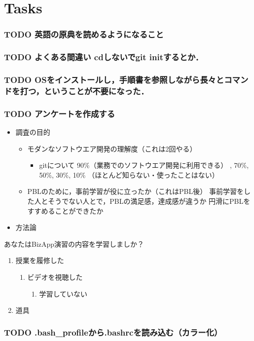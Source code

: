 \documentclass[t, aspectratio=169]{beamer}
\begin{document}
\part{Tasks}
\label{sec-11}
\section{{\bfseries\sffamily TODO} 英語の原典を読めるようになること}
\label{sec-11-1}
\section{{\bfseries\sffamily TODO} よくある間違い cdしないでgit initするとか．}
\label{sec-11-2}
\section{{\bfseries\sffamily TODO} OSをインストールし，手順書を参照しながら長々とコマンドを打つ，ということが不要になった．}
\label{sec-11-3}
\section{{\bfseries\sffamily TODO} アンケートを作成する}
\label{sec-11-4}
\begin{itemize}
\item 調査の目的
\begin{itemize}
\item モダンなソフトウエア開発の理解度（これは2回やる）
\begin{itemize}
\item gitについて
90\%（業務でのソフトウエア開発に利用できる）
  , 70\%, 50\%, 30\%,
10\% （ほとんど知らない・使ったことはない）
\end{itemize}
\item PBLのために，事前学習が役に立ったか（これはPBL後）
事前学習をした人とそうでない人とで，PBLの満足感，達成感が違うか
円滑にPBLをすすめることができたか
\end{itemize}

\item 方法論
\end{itemize}
あなたはBizApp演習の内容を学習しましか？
\begin{enumerate}
\item 授業を履修した
\begin{enumerate}
\item ビデオを視聴した
\begin{enumerate}
\item 学習していない
\end{enumerate}
\end{enumerate}
\item 道具
\end{enumerate}

\section{{\bfseries\sffamily TODO} .bash\_profileから.bashrcを読み込む（カラー化）}
\label{sec-11-5}
\end{document}
